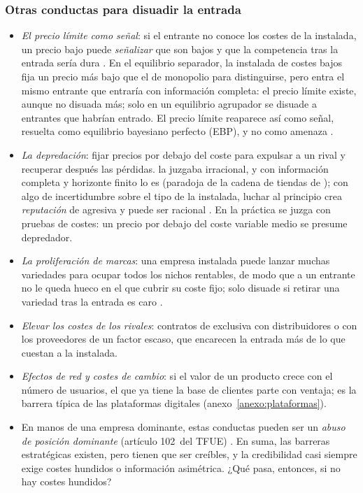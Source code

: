 \documentclass[11pt]{article}
\begin{document}
\subsubsection{Otras conductas para disuadir la entrada}\label{sec:otras-conductas}

\begin{itemize}
\item \emph{El precio límite como señal}\nocite{MilgromRoberts1982Limit}: si el entrante no conoce los costes de la instalada, un precio bajo puede \emph{señalizar} que son bajos y que la competencia tras la entrada sería dura . En el equilibrio separador, la instalada de costes bajos fija un precio más bajo que el de monopolio para distinguirse, pero entra el mismo entrante que entraría con información completa: el precio límite existe, aunque no disuada más; solo en un equilibrio agrupador se disuade a entrantes que habrían entrado. El precio límite reaparece así como señal, resuelta como equilibrio bayesiano perfecto (EBP), y no como amenaza .
\item \emph{La depredación}: fijar precios por debajo del coste para expulsar a un rival y recuperar después las pérdidas.  la juzgaba irracional\nocite{McGee1958Predatory}, y con información completa y horizonte finito lo es (paradoja de la cadena de tiendas de \textcite{Selten1978Chain}); con algo de incertidumbre sobre el tipo de la instalada, luchar al principio crea \emph{reputación} de agresiva y puede ser racional\nocite{KrepsWilson1982Reputation,MilgromRoberts1982Predation} . En la práctica se juzga con pruebas de costes: un precio por debajo del coste variable medio se presume depredador\nocite{AreedaTurner1975Predatory}.
\item \emph{La proliferación de marcas}: una empresa instalada puede lanzar muchas variedades para ocupar todos los nichos rentables, de modo que a un entrante no le queda hueco en el que cubrir su coste fijo\nocite{Schmalensee1978Entry}; solo disuade si retirar una variedad tras la entrada es caro\nocite{Judd1985Credible} .
\item \emph{Elevar los costes de los rivales}: contratos de exclusiva con distribuidores o con los proveedores de un factor escaso, que encarecen la entrada más de lo que cuestan a la instalada\nocite{SalopScheffman1983Raising}.
\item \emph{Efectos de red y costes de cambio}: si el valor de un producto crece con el número de usuarios, el que ya tiene la base de clientes parte con ventaja; es la barrera típica de las plataformas digitales (anexo~\ref{anexo:plataformas}).
\item En manos de una empresa dominante, estas conductas pueden ser un \emph{abuso de posición dominante} (artículo 102~del TFUE) . En suma, las barreras estratégicas existen, pero tienen que ser creíbles, y la credibilidad casi siempre exige costes hundidos o información asimétrica. ¿Qué pasa, entonces, si no hay costes hundidos?
\end{itemize}
\end{document}
